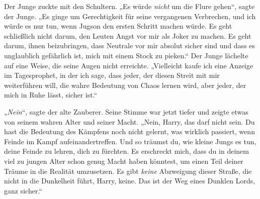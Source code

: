 Der Junge zuckte mit den Schultern.
„Es würde \emph{nicht} um die Flure gehen“, sagte der Junge.
„Es ginge um Gerechtigkeit für seine vergangenen Verbrechen, und ich würde es nur tun, wenn Jugson den ersten Schritt machen würde. Es geht schließlich nicht darum, den Leuten Angst vor mir als Joker zu machen. Es geht darum, ihnen beizubringen, dass Neutrale vor mir absolut sicher sind und dass es unglaublich gefährlich ist, mich mit einem Stock zu pieken.“ Der Junge lächelte auf eine Weise, die seine Augen nicht erreichte.
„Vielleicht kaufe ich eine Anzeige im Tagesprophet, in der ich sage, dass jeder, der diesen Streit mit mir weiterführen will, die wahre Bedeutung von Chaos lernen wird, aber jeder, der mich in Ruhe lässt, sicher ist.“

„\emph{Nein}“, sagte der alte Zauberer. Seine Stimme war jetzt tiefer und zeigte etwas von seinem wahren Alter und seiner Macht.
„Nein, Harry, das darf nicht sein. Du hast die Bedeutung des Kämpfens noch nicht gelernt, was wirklich passiert, wenn Feinde im Kampf aufeinandertreffen. Und so träumst du, wie kleine Jungs es tun, deine Feinde zu lehren, dich zu fürchten. Es erschreckt mich, dass du in deinem viel zu jungen Alter schon genug Macht haben könntest, um einen Teil deiner Träume in die Realität umzusetzen. Es gibt \emph{keine} Abzweigung dieser Straße, die nicht in die Dunkelheit führt, Harry, keine. Das ist der Weg eines Dunklen Lords, ganz sicher.“

